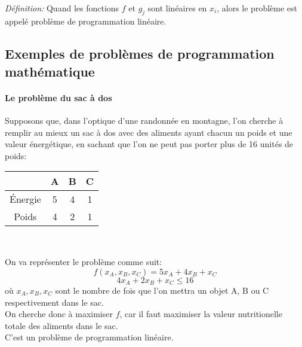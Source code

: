 \documentclass[a4paper]{article}
\begin{document}
\paragraph{}
\emph{Définition: }
Quand les fonctions \(f\) et \(g_j\) sont linéaires en \(x_i\), alors le
problème est appelé problème de programmation linéaire.

\subsection{Exemples de problèmes de programmation mathématique}
\paragraph{Le problème du sac à dos} Supposons que, dans l'optique d'une
randonnée en montagne, l'on cherche à remplir au mieux un sac à dos avec des
aliments ayant chacun un poids et une valeur énergétique, en sachant que l'on ne
peut pas porter plus de 16 unités de poids:
\begin{center}
\begin{tabular}{|c|c|c|c|}
\hline
 & A & B & C \\
\hline
Énergie & 5 & 4 & 1 \\
\hline
Poids & 4 & 2 & 1 \\
\hline
\end{tabular}
\\
\end{center}
On va représenter le problème comme suit:
\[f(x_A, x_B, x_C) =5x_A + 4x_B + x_C\]
\[4x_A + 2x_B + x_C \le 16\]
où \(x_A,x_B,x_C\) sont le nombre de fois que l'on mettra un objet A, B ou C
respectivement dans le sac.\\
On cherche donc à maximiser \(f\), car il faut maximiser la valeur nutritionelle
totale des aliments dans le sac.\\
C'est un problème de programmation linéaire.
\end{document}
